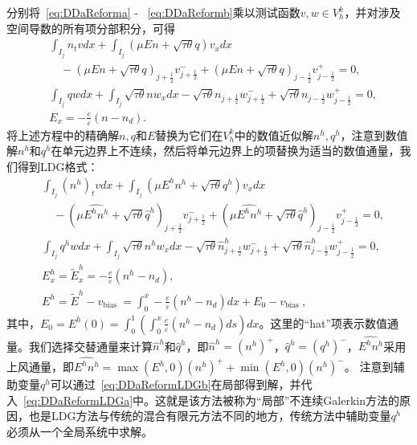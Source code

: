 分别将~\eqref{eq:DDaReforma} - ~\eqref{eq:DDaReformb}乘以测试函数$v, w \in V_{h}^{k}$，并对涉及空间导数的所有项分部积分，可得
\begin{align}
     & \int_{I_{j}} n_{t} v d x+\int_{I_{j}}(\mu E n+\sqrt{\tau \theta} q) v_{x} d x                                                                                                             \\
     & \quad-(\mu E n+\sqrt{\tau \theta} q)_{j+\frac{1}{2}} v_{j+\frac{1}{2}}^{-}+(\mu E n+\sqrt{\tau \theta} q)_{j-\frac{1}{2}} v_{j-\frac{1}{2}}^{+}=0,                                        \\
     & \int_{I_{j}} q w d x+\int_{I_{j}} \sqrt{\tau \theta} n w_{x} d x-\sqrt{\tau \theta} n_{j+\frac{1}{2}} w_{j+\frac{1}{2}}^{-}+\sqrt{\tau \theta} n_{j-\frac{1}{2}} w_{j-\frac{1}{2}}^{+}=0, \\
     & E_{x}=-\frac{e}{\varepsilon}\left(n-n_{d}\right) .
\end{align}
将上述方程中的精确解$n, q$和$E$替换为它们在$V_{h}^{k}$中的数值近似解$n^{h}, q^{h}$，注意到数值解$n^{h}$和$q^{h}$在单元边界上不连续，然后将单元边界上的项替换为适当的数值通量，我们得到LDG格式：
\begin{align}
     & \int_{I_{j}}\left(n^{h}\right)_{t} v d x+\int_{I_{j}}\left(\mu E^{h} n^{h}+\sqrt{\tau \theta} q^{h}\right) v_{x} d x      \nonumber                                                                                                                       \\
     & \quad-\left(\mu \widehat{E^{h} n^{h}}+\sqrt{\tau \theta} \hat{q}^{h}\right)_{j+\frac{1}{2}} v_{j+\frac{1}{2}}^{-}+\left(\mu \widehat{E^{h} n^{h}}+\sqrt{\tau \theta} \hat{q}^{h}\right)_{j-\frac{1}{2}} v_{j-\frac{1}{2}}^{+}=0, \label{eq:DDaReformLDGa} \\
     & \int_{I_{j}} q^{h} w d x+\int_{I_{j}} \sqrt{\tau \theta} n^{h} w_{x} d x-\sqrt{\tau \theta} \hat{n}_{j+\frac{1}{2}}^{h} w_{j+\frac{1}{2}}^{-}+\sqrt{\tau \theta} \hat{n}_{j-\frac{1}{2}}^{h} w_{j-\frac{1}{2}}^{+}=0,            \label{eq:DDaReformLDGb} \\
     & E_{x}^{h}=\tilde{E}_{x}^{h}=-\frac{e}{\varepsilon}\left(n^{h}-n_{d}\right),   \label{eq:DDaReformLDGc}                                                                                                                                                    \\
     & E^{h}=\tilde{E}^{h}-v_{\text {bias }}=\int_{0}^{x}-\frac{e}{\varepsilon}\left(n^{h}-n_{d}\right) d x+E_{0}-v_{\text {bias }},\label{eq:DDaReformLDGd}
\end{align}
其中，$E_{0}=E^{h}(0)=\int_{0}^{1}\left(\int_{0}^{x} \frac{e}{\varepsilon}\left(n^{h}-n_{d}\right) d s\right) d x$。这里的“hat”项表示数值通量。我们选择交替通量来计算$\hat{n}^{h}$和$\hat{q}^{h}$，即$\hat{n}^{h}=\left(n^{h}\right)^{+}$，$\hat{q}^{h}=\left(q^{h}\right)^{-}$，$\widehat{E^{h} n^{h}}$采用上风通量，即$\widehat{E^{h} n^{h}}=\max \left(E^{h}, 0\right)\left(n^{h}\right)^{+}+\min \left(E^{h}, 0\right)\left(n^{h}\right)^{-}$。
注意到辅助变量$q^{h}$可以通过~\eqref{eq:DDaReformLDGb}在局部得到解，并代入~\eqref{eq:DDaReformLDGa}中。这就是该方法被称为“局部”不连续Galerkin方法的原因，也是LDG方法与传统的混合有限元方法不同的地方，传统方法中辅助变量$q^{h}$必须从一个全局系统中求解。
